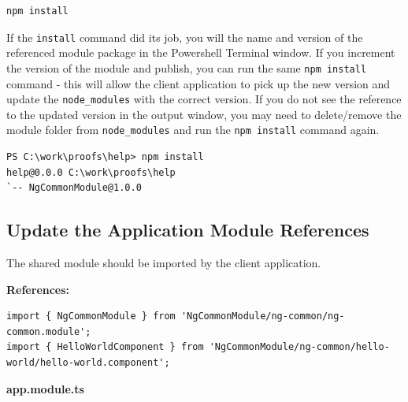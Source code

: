 \documentclass[]{book}
\theoremstyle{definition}
\theoremstyle{definition}
\theoremstyle{definition}
\theoremstyle{remark}
\begin{document}
\begin{verbatim}
npm install
\end{verbatim}

If the \texttt{install} command did its job, you will the name and
version of the referenced module package in the Powershell Terminal
window. If you increment the version of the module and publish, you can
run the same \texttt{npm\ install} command - this will allow the client
application to pick up the new version and update the
\texttt{node\_modules} with the correct version. If you do not see the
reference to the updated version in the output window, you may need to
delete/remove the module folder from \texttt{node\_modules} and run the
\texttt{npm\ install} command again.

\begin{verbatim}
PS C:\work\proofs\help> npm install
help@0.0.0 C:\work\proofs\help
`-- NgCommonModule@1.0.0
\end{verbatim}

\subsection{Update the Application Module
References}\label{update-the-application-module-references}

The shared module should be imported by the client application.

\textbf{References:}

\begin{verbatim}
import { NgCommonModule } from 'NgCommonModule/ng-common/ng-common.module';
import { HelloWorldComponent } from 'NgCommonModule/ng-common/hello-world/hello-world.component';
\end{verbatim}

\textbf{app.module.ts}
\end{document}
